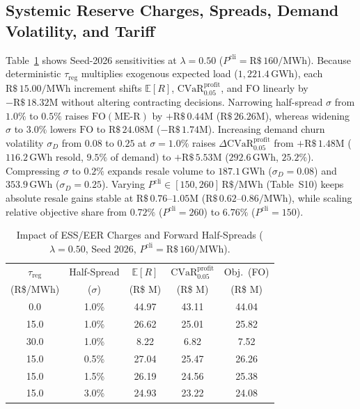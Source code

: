 \documentclass[10pt,journal]{IEEEtran}
\begin{document}
\subsection{Systemic Reserve Charges, Spreads, Demand Volatility, and Tariff}
Table~\ref{tab:sensibilidade} shows Seed-2026 sensitivities at $\lambda = 0.50$ ($P^{\text{cli}} = \text{R\$}\,160/\text{MWh}$). Because deterministic $\tau_{\text{reg}}$ multiplies exogenous expected load ($1,221.4\,\text{GWh}$), each $\text{R\$}\,15.00/\text{MWh}$ increment shifts $\mathbb{E}[R]$, $\mathrm{CVaR}_{0.05}^{\mathrm{profit}}$, and $\mathrm{FO}$ linearly by $-\text{R\$}\,18.32\text{M}$ without altering contracting decisions. Narrowing half-spread $\sigma$ from $1.0\%$ to $0.5\%$ raises $\mathrm{FO}(\text{ME-R})$ by $+\text{R\$}\,0.44\text{M}$ ($\text{R\$}\,26.26\text{M}$), whereas widening $\sigma$ to $3.0\%$ lowers $\mathrm{FO}$ to $\text{R\$}\,24.08\text{M}$ ($-\text{R\$}\,1.74\text{M}$). Increasing demand churn volatility $\sigma_D$ from $0.08$ to $0.25$ at $\sigma = 1.0\%$ raises $\Delta\mathrm{CVaR}_{0.05}^{\mathrm{profit}}$ from $+\text{R\$}\,1.48\text{M}$ ($116.2\,\text{GWh}$ resold, $9.5\%$ of demand) to $+\text{R\$}\,5.53\text{M}$ ($292.6\,\text{GWh}$, $25.2\%$). Compressing $\sigma$ to $0.2\%$ expands resale volume to $187.1\,\text{GWh}$ ($\sigma_D=0.08$) and $353.9\,\text{GWh}$ ($\sigma_D=0.25$). Varying $P^{\text{cli}} \in [150, 260]\,\text{R\$/MWh}$ (Table~S10) keeps absolute resale gains stable at $\text{R\$}\,0.76$--$1.05\text{M}$ ($\text{R\$}\,0.62$--$0.86/\text{MWh}$), while scaling relative objective share from $0.72\%$ ($P^{\text{cli}} = 260$) to $6.76\%$ ($P^{\text{cli}} = 150$).

\begin{table}[t]
\centering
\caption{Impact of ESS/EER Charges and Forward Half-Spreads ($\lambda = 0.50$, Seed 2026, $P^{\text{cli}} = \text{R\$}\,160/\text{MWh}$).}
\label{tab:sensibilidade}
\scriptsize
\setlength{\tabcolsep}{4pt}
\begin{tabular}{ccccc}
\toprule
$\tau_{\text{reg}}$ & Half-Spread & $\mathbb{E}[R]$ & $\mathrm{CVaR}_{0.05}^{\mathrm{profit}}$ & Obj.\ (FO) \\
(R\$/MWh) & ($\sigma$) & (R\$ M) & (R\$ M) & (R\$ M) \\
\midrule
0.0  & 1.0\% & 44.97 & 43.11 & 44.04 \\
15.0 & 1.0\% & 26.62 & 25.01 & 25.82 \\
30.0 & 1.0\% & 8.22  & 6.82  & 7.52  \\
\midrule
15.0 & 0.5\% & 27.04 & 25.47 & 26.26 \\
15.0 & 1.5\% & 26.19 & 24.56 & 25.38 \\
15.0 & 3.0\% & 24.93 & 23.22 & 24.08 \\
\bottomrule
\end{tabular}
\end{table}
\end{document}
